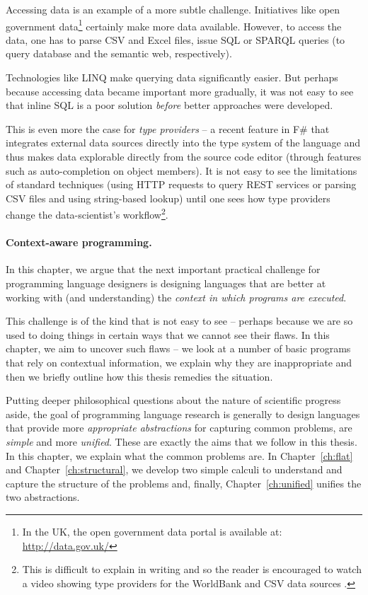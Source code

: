Accessing data is an example of a more subtle challenge. Initiatives like open government data\footnote{
In the UK, the open government data portal is available at: \url{http://data.gov.uk/}}
certainly make more data available. However, to access the data, one has to parse CSV and Excel files, 
issue SQL or SPARQL queries (to query database and the semantic web, respectively).

Technologies like LINQ \cite{app-linq} make querying data significantly easier. But perhaps 
because accessing data became important more gradually, it was not easy to see that inline
SQL is a poor solution \emph{before} better approaches were developed.

This is even more the case for \emph{type providers} -- a recent feature in F\# that integrates
external data sources directly into the type system of the language and thus makes data explorable
directly from the source code editor (through features such as auto-completion on object members).
It is not easy to see the limitations of standard techniques (using HTTP requests to query REST 
services or parsing CSV files and using string-based lookup) until one sees how type providers 
change the data-scientist's workflow\footnote{This is difficult to explain in writing and so the 
reader is encouraged to watch a video showing type providers for the WorldBank and CSV data 
sources \cite{app-fsharp-world}.}.

\paragraph{Context-aware programming.}

In this chapter, we argue that the next important practical challenge for programming language 
designers is designing languages that are better at working with (and understanding) the 
\emph{context in which programs are executed}. 

This challenge is of the kind that is not easy to see -- perhaps because we are so used to 
doing things in certain ways that we cannot see their flaws. In this chapter, we aim to
uncover such flaws -- we look at a number of basic programs that rely on contextual 
information, we explain why they are inappropriate and then we briefly outline how this
thesis remedies the situation.

Putting deeper philosophical questions about the nature of scientific prog\-ress aside,
the goal of programming language research is generally to design languages that provide 
more \emph{appropriate abstractions} for capturing common problems, are \emph{simple} and 
more \emph{unified}. 
These are exactly the aims that we follow in this thesis. In this chapter, we explain what
the common problems are. In Chapter~\ref{ch:flat} and Chapter~\ref{ch:structural},
we develop two simple calculi to understand and capture the structure of the problems and,
finally, Chapter~\ref{ch:unified} unifies the two abstractions.

